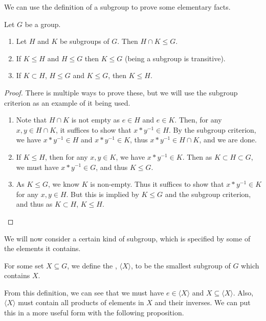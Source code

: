 We can use the definition of a subgroup to prove some elementary facts.
\begin{proposition}
	Let $G$ be a group.
	\begin{enumerate}[label=(\roman*)]
		\item Let $H$ and $K$ be subgroups of $G$. Then $H \cap K \leq G$.
		\item If $K \leq H$ and $H \leq G$ then $K \leq G$ (being a subgroup is transitive).
		\item If $K \subset H$, $H \leq G$ and $K \leq G$, then $K \leq H$. 
	\end{enumerate}
\end{proposition}
\begin{proof} There is multiple ways to prove these, but we will use the subgroup criterion as an example of it being used.\phantom{\qedhere}
	\begin{enumerate}[label=(\roman*)]
		\item Note that $H \cap K$ is not empty as $e \in H$ and $e \in K$. Then, for any $x, y \in H \cap K$, it suffices to show that $x * y^{-1} \in H$. By the subgroup criterion, we have $x * y^{-1} \in H$ and $x*y^{-1} \in K$, thus $x * y^{-1} \in H \cap K$, and we are done.
		\item If $K \leq H$, then for any $x, y \in K$, we have $x * y^{-1} \in K$. Then as $K \subset H \subset G$, we must have $x * y^{-1} \in G$, and thus $K \leq G$.
		\item As $K \leq G$, we know $K$ is non-empty. Thus it suffices to show that $x * y^{-1} \in K$ for any $x, y \in H$. But this is implied by $K \leq G$ and the subgroup criterion, and thus as $K \subset H$, $K \leq H$. \hfill \qedsymbol
	\end{enumerate}
\end{proof}


We will now consider a certain kind of subgroup, which is specified by some of the elements it contains.

\begin{definition}
	For some set $X \subseteq G$, we define the , $\langle X \rangle$, to be the smallest subgroup of $G$ which contains $X$.
\end{definition}

From this definition, we can see that we must have $e \in \langle X \rangle$ and $X \subseteq \langle X\rangle$. Also, $\langle X \rangle$ must contain all products of elements in $X$ and their inverses.
We can put this in a more useful form with the following proposition.

